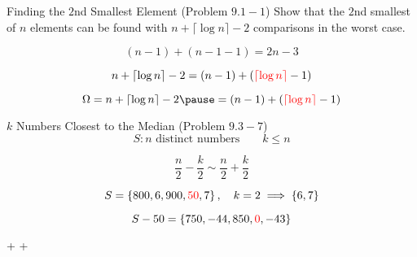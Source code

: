
\begin{frame}{}
  \begin{exampleblock}{Finding the $2$nd Smallest Element (Problem $9.1-1$)}
    Show that the $2$nd smallest of $n$ elements can be found with $n + \lceil \log n \rceil - 2$
    comparisons in the worst case.
  \end{exampleblock}

  \pause
  \[
    (n-1) + (n-1-1) = 2n-3
  \]
\end{frame}

\begin{frame}{}
  \[
    n + \lceil \log n \rceil - 2 = (n-1) + (\textcolor{red}{\lceil \log n \rceil} - 1)
  \]

  \pause
  \begin{adjustbox}{max totalsize={.7\textwidth}{.6\textheight},center}
    
  \end{adjustbox}


\end{frame}

\begin{frame}{}
  \[
    \Omega = n + \lceil \log n \rceil - 2 \pause = (n-1) + (\red{\lceil \log n \rceil} - 1)
  \]

  \pause
  \centerline{}
\end{frame}

\begin{frame}{}
  \begin{exampleblock}{$k$ Numbers Closest to the Median (Problem $9.3-7$)}
    \[
      S: n \text{ distinct numbers} \qquad k \le n
    \]
  \end{exampleblock}

  \pause
  \[
    \frac{n}{2} - \frac{k}{2} \sim \frac{n}{2} + \frac{k}{2}
  \]

  \pause
  \[
    S = \left\{800, 6, 900, \textcolor{red}{50}, 7\right\}, \quad k = 2 \implies \left\{6,7\right\}
  \]

  \pause
  \[
    S - 50 = \left\{750, -44, 850, \textcolor{red}{0}, -43\right\}
  \]

  \pause
  \vspace{0.50cm}
  \centerline{ +  + }
\end{frame}
